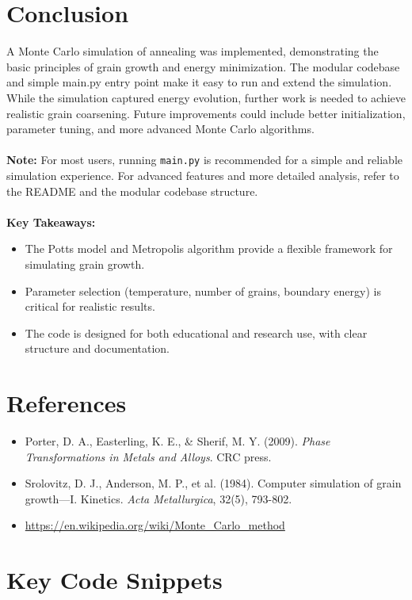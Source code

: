 \documentclass[12pt]{article}
\begin{document}
\section{Conclusion}
A Monte Carlo simulation of annealing was implemented, demonstrating the basic principles of grain growth and energy minimization. The modular codebase and simple main.py entry point make it easy to run and extend the simulation. While the simulation captured energy evolution, further work is needed to achieve realistic grain coarsening. Future improvements could include better initialization, parameter tuning, and more advanced Monte Carlo algorithms.\\
\\
\textbf{Note:} For most users, running \texttt{main.py} is recommended for a simple and reliable simulation experience. For advanced features and more detailed analysis, refer to the README and the modular codebase structure.\\
\\
\textbf{Key Takeaways:}
\begin{itemize}
    \item The Potts model and Metropolis algorithm provide a flexible framework for simulating grain growth.
    \item Parameter selection (temperature, number of grains, boundary energy) is critical for realistic results.
    \item The code is designed for both educational and research use, with clear structure and documentation.
\end{itemize}

\section{References}
\begin{itemize}
    \item Porter, D. A., Easterling, K. E., \& Sherif, M. Y. (2009). \textit{Phase Transformations in Metals and Alloys}. CRC press.
    \item Srolovitz, D. J., Anderson, M. P., et al. (1984). Computer simulation of grain growth—I. Kinetics. \textit{Acta Metallurgica}, 32(5), 793-802.
    \item \url{https://en.wikipedia.org/wiki/Monte_Carlo_method}
\end{itemize}

\section{Key Code Snippets}
\end{document}
